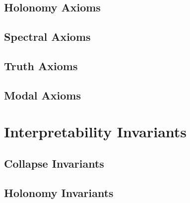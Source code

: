 \subsection{Holonomy Axioms}
\begin{axiom}
\end{axiom}

\subsection{Spectral Axioms}
\begin{axiom}
\end{axiom}

\subsection{Truth Axioms}
\begin{axiom}
\end{axiom}

\subsection{Modal Axioms}
\begin{axiom}
\end{axiom}



\section{Interpretability Invariants}
\subsection{Collapse Invariants}
\begin{definition}
\end{definition}

\subsection{Holonomy Invariants}
\begin{definition}
\end{definition}

